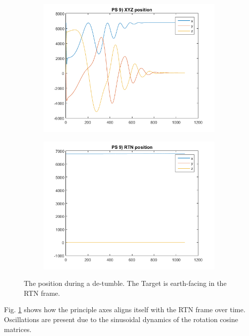 \documentclass[12pt, letterpaper]{article}
\begin{document}
\begin{figure}[H]
	\centering
	\begin{subfigure}[b]{0.49\textwidth}
	\includegraphics[width=\textwidth]{ps9_02}
	\end{subfigure}
	\begin{subfigure}[b]{0.49\textwidth}
		\includegraphics[width=\textwidth]{ps9_03}
	\end{subfigure}
	\caption{The position during a de-tumble. The Target is earth-facing in the RTN frame.}
	\label{(9:pos)}
\end{figure}

Fig. \ref{(9:pos)} shows how the principle axes aligns itself with the RTN frame over time. Oscillations are present due to the sinusoidal dynamics of the rotation cosine matrices.
\end{document}

